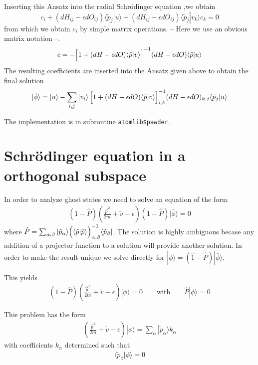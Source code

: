 \documentclass[11pt,a4paper]{report}
\begin{document}
Inserting this Ansatz  into the radial
Schr\"odinger equation ,we obtain
\begin{equation}
c_i + (dH_{ij} - \epsilon dO_{ij}) \langle\tilde{p}_j|u\rangle
+(dH_{ij} - \epsilon dO_{ij}) \langle\tilde{p}_j|v_k\rangle c_k=0
\end{equation}
from which we obtain $c_i$ by simple matrix operations. -- Here we use
an obvious matrix notation --.
\begin{equation}
c=-\Bigl\lbrack 1+(dH-\epsilon dO)\langle\tilde{p}|v\rangle\Bigr\rbrack^{-1}
(dH-\epsilon dO) \langle\tilde{p}|u\rangle
\end{equation}
The resulting coefficients are inserted into the Ansatz given above to
obtain the final solution
\begin{eqnarray}
\ket{\tilde{\phi}}=\ket{u}-\sum_{i,j}\ket{v_i}
\Bigl\lbrack 1+(dH-\epsilon dO)\langle\tilde{p}|v\rangle\Bigr\rbrack^{-1}_{i,k}
(dH-\epsilon dO)_{k,j} \langle\tilde{p}_j|u\rangle
\end{eqnarray}

The implementation is in subroutine \verb|atomlib$pawder|.

\section{Schr\"odinger equation in a orthogonal subspace}
\label{app:schrortho}
In order to analyze ghost states we need to solve an equation of the
form
\begin{eqnarray}
(1-\hat{P})\left(\frac{\vec{p}^2}{2m}+\tilde{v}-\epsilon\right)(1-\hat{P})
|\bar{\phi}\rangle=0
\end{eqnarray}
where $\hat{P}=\sum_{\alpha,\beta}|\tilde{p}_\alpha\rangle
\Bigl(\langle\tilde{p}|\tilde{p}\rangle\Bigl)^{-1}_{\alpha,\beta}
\langle\tilde{p}_\beta|$.  The solution is highly ambiguous becase any
addition of a projector function to a solution will provide another
solution. In order to make the result unique we solve directly for
$|\phi\rangle=(\hat{1}-\hat{P})|\bar{\phi}\rangle$.

This yields
\begin{eqnarray}
(1-\hat{P})\left(\frac{\vec{p}^2}{2m}+\tilde{v}-\epsilon\right)|\phi\rangle=0
\qquad\text{with}\qquad\hat{P}|\phi\rangle=0
\end{eqnarray}

This problem has the form
\begin{eqnarray}
\left(\frac{\vec{p}^2}{2m}+\tilde{v}-\epsilon\right)|\phi\rangle
=\sum_\alpha |\tilde{p}_\alpha\rangle k_\alpha
\label{eq:orthodefeq1}
\end{eqnarray}
with coefficients $k_\alpha$ determined such that
\begin{eqnarray}
\langle\tilde{p}_\beta|\phi\rangle=0
\label{eq:orthodefeq2}
\end{eqnarray}
\end{document}
